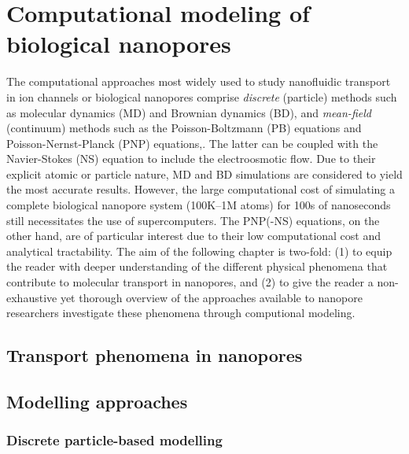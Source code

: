 \chapter{Computational modeling of biological nanopores}\label{ch:modelling}

The computational approaches most widely used to study nanofluidic transport in ion channels or biological
nanopores comprise \emph{discrete} (particle) methods such as molecular dynamics
(MD)\cite{Lynden-Bell-1996,Allen-1999,Aksimentiev-2005,Luan-2008,Bhattacharya-2011,Zhang-2014,DiMarino-2015,Belkin-2016}
and Brownian dynamics
(BD),\cite{Schirmer-1999,Im-2002,Noskov-2004,Millar-2008,Egwolf-2010,DeBiase-2015,Pederson-2015} and
\emph{mean-field} (continuum) methods such as the Poisson-Boltzmann (PB)
equations\cite{Grochowski-2008,Baldessari-2008-1} and Poisson-Nernst-Planck (PNP)
equations,\cite{Eisenberg-1996,Gillespie-2002,Simakov-2010}. The latter can be coupled with the Navier-Stokes
(NS) equation to include the electroosmotic flow.\cite{Lu-2012,Pederson-2015} Due to their explicit atomic or
particle nature, MD and BD simulations are considered to yield the most accurate results. However, the large
computational cost of simulating a complete biological nanopore system (100K--1M atoms) for 100s of
nanoseconds still necessitates the use of supercomputers.\cite{Aksimentiev-2005,Bhattacharya-2011} The
PNP(-NS) equations, on the other hand, are of particular interest due to their low computational cost and
analytical tractability. The aim of the following chapter is two-fold: (1) to equip the reader with deeper
understanding of the different physical phenomena that contribute to molecular transport in nanopores, and
(2) to give the reader a non-exhaustive yet thorough overview of the approaches available to nanopore
researchers investigate these phenomena through computional modeling.

\section{Transport phenomena in nanopores}


\section{Modelling approaches}

\subsection{Discrete particle-based modelling}

